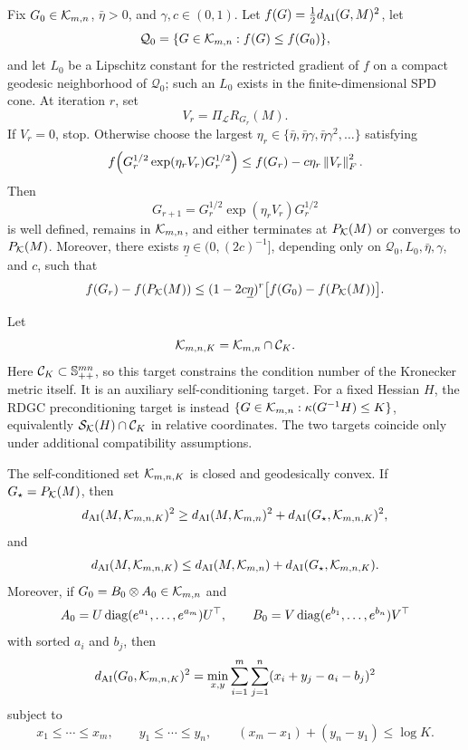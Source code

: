\begin{corollary}
\label{cor:kron-armijo-solver}
Fix \(G_0\in\mathcal K_{m,n}\), \(\bar\eta>0\), and
\(\gamma,c\in(0,1)\). Let \(f(G)=\frac12d_{\mathrm{AI}}(G,M)^2\), let
\[
  \mathcal Q_0=\{G\in\mathcal K_{m,n}:f(G)\le f(G_0)\},
\]
and let \(L_0\) be a Lipschitz constant for the restricted gradient of \(f\) on
a compact geodesic neighborhood of \(\mathcal Q_0\); such an \(L_0\) exists in
the finite-dimensional SPD cone. At iteration \(r\), set
\[
  V_r=\Pi_{\mathcal L}R_{G_r}(M).
\]
If \(V_r=0\), stop. Otherwise choose the largest
\(\eta_r\in\{\bar\eta,\bar\eta\gamma,\bar\eta\gamma^2,\ldots\}\) satisfying
\[
  f\!\left(G_r^{1/2}\exp(\eta_rV_r)G_r^{1/2}\right)
  \le
  f(G_r)-c\eta_r\left\lVert V_r\right\rVert_F^2.
\]
Then
\[
  G_{r+1}=G_r^{1/2}\exp(\eta_rV_r)G_r^{1/2}
\]
is well defined, remains in \(\mathcal K_{m,n}\), and either terminates at
\(P_{\mathcal K}(M)\) or converges to \(P_{\mathcal K}(M)\). Moreover, there exists
\(\underline\eta\in(0,(2c)^{-1}]\), depending only on
\(\mathcal Q_0,L_0,\bar\eta,\gamma\), and \(c\), such that
\[
  f(G_r)-f(P_{\mathcal K}(M))
  \le
  (1-2c\underline\eta)^r
  \bigl[f(G_0)-f(P_{\mathcal K}(M))\bigr].
\]
\end{corollary}

\begin{theorem}
\label{thm:kron-k-target}
Let
\[
  \mathcal K_{m,n,K}=\mathcal K_{m,n}\cap\mathcal C_K.
\]
Here \(\mathcal C_K\subset\mathbb S_{++}^{mn}\), so this target constrains the condition number of
the Kronecker metric itself. It is an auxiliary self-conditioning target. For a
fixed Hessian \(H\), the RDGC preconditioning target is instead
\(\{G\in\mathcal K_{m,n}:\kappa(G^{-1}H)\le K\}\), equivalently
\(\mathcal S_{\mathcal K}(H)\cap\mathcal C_K\) in relative coordinates. The two targets
coincide only under additional compatibility assumptions.

The self-conditioned set \(\mathcal K_{m,n,K}\) is closed and geodesically convex. If
\(G_\star=P_{\mathcal K}(M)\), then
\[
  d_{\mathrm{AI}}(M,\mathcal K_{m,n,K})^2
  \ge
  d_{\mathrm{AI}}(M,\mathcal K_{m,n})^2
  +
  d_{\mathrm{AI}}(G_\star,\mathcal K_{m,n,K})^2,
\]
and
\[
  d_{\mathrm{AI}}(M,\mathcal K_{m,n,K})
  \le
  d_{\mathrm{AI}}(M,\mathcal K_{m,n})
  +
  d_{\mathrm{AI}}(G_\star,\mathcal K_{m,n,K}).
\]
Moreover, if \(G_0=B_0\otimes A_0\in\mathcal K_{m,n}\) and
\[
  A_0=U\operatorname{diag}(e^{a_1},\ldots,e^{a_m})U^\top,\qquad
  B_0=V\operatorname{diag}(e^{b_1},\ldots,e^{b_n})V^\top
\]
with sorted \(a_i\) and \(b_j\), then
\[
  d_{\mathrm{AI}}(G_0,\mathcal K_{m,n,K})^2
  =
  \min_{x,y}
  \sum_{i=1}^m\sum_{j=1}^n(x_i+y_j-a_i-b_j)^2
\]
subject to
\[
  x_1\le\cdots\le x_m,\qquad
  y_1\le\cdots\le y_n,\qquad
  (x_m-x_1)+(y_n-y_1)\le\log K.
\]
\end{theorem}


